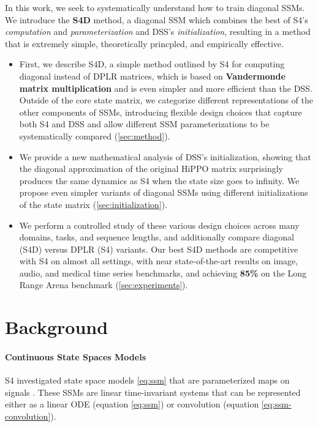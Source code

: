 \documentclass{article}
\begin{document}
In this work, we seek to systematically understand how to train diagonal SSMs.
We introduce the \textbf{S4D} method, a diagonal SSM which combines the best of S4's \emph{computation} and \emph{parameterization} and DSS's \emph{initialization}, resulting in a method that is extremely simple, theoretically princpled, and empirically effective.
\begin{itemize}[leftmargin=*,itemsep=0pt]\item First, we describe S4D, a simple method outlined by S4 for computing diagonal instead of DPLR matrices, which is based on \textbf{Vandermonde matrix multiplication} and is even simpler and more efficient than the DSS.
    Outside of the core state matrix, we categorize different representations of the other components of SSMs, introducing flexible design choices that capture both S4 and DSS and allow different SSM parameterizations to be systematically compared (\cref{sec:method}).
  \item We provide a new mathematical analysis of DSS's initialization, showing that the diagonal approximation of the original HiPPO matrix surprisingly produces the same dynamics as S4 when the state size goes to infinity.
    We propose even simpler variants of diagonal SSMs using different initializations of the state matrix (\cref{sec:initialization}).
  \item We perform a controlled study of these various design choices across many domains, tasks, and sequence lengths, and additionally compare diagonal (S4D) versus DPLR (S4) variants.
    Our best S4D methods are competitive with S4 on almost all settings, with near state-of-the-art results on image, audio, and medical time series benchmarks, and achieving \textbf{85\%} on the Long Range Arena benchmark (\cref{sec:experiments}).
\end{itemize}







 

\section{Background}

\paragraph{Continuous State Spaces Models}

S4 investigated state space models \eqref{eq:ssm} that are parameterized maps on signals .
These SSMs are linear time-invariant systems that can be represented either as a linear ODE (equation \eqref{eq:ssm})
or convolution (equation \eqref{eq:ssm-convolution}).
\end{document}
